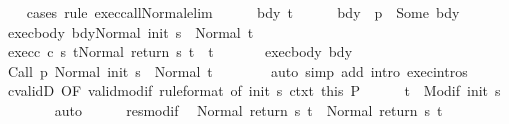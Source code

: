 \begin{isabellebody}
\ \ \isamarkupfalse%
\ {\isacharparenleft}cases\ rule{\isacharcolon}\ exec{\isacharunderscore}call{\isacharunderscore}Normal{\isacharunderscore}elim{\isacharparenright}\isanewline
\ \ \ \ \isamarkupfalse%
\ bdy\ t{\isacharprime}\isanewline
\ \ \ \ \isamarkupfalse%
\ bdy{\isacharcolon}\ {\isachardoublequoteopen}{\isasymGamma}\ p\ {\isacharequal}\ Some\ bdy{\isachardoublequoteclose}\isanewline
\ \ \ \ \isamarkupfalse%
\ exec{\isacharunderscore}body{\isacharcolon}\ {\isachardoublequoteopen}{\isasymGamma}{\isasymturnstile}{\isasymlangle}bdy{\isacharcomma}Normal\ {\isacharparenleft}init\ s{\isacharparenright}{\isasymrangle}\ {\isasymRightarrow}\ Normal\ t{\isacharprime}{\isachardoublequoteclose}\ \isanewline
\ \ \ \ \isamarkupfalse%
\ exec{\isacharunderscore}c{\isacharcolon}\ {\isachardoublequoteopen}{\isasymGamma}{\isasymturnstile}{\isasymlangle}c\ s\ t{\isacharprime}{\isacharcomma}Normal\ {\isacharparenleft}return\ s\ t{\isacharprime}{\isacharparenright}{\isasymrangle}\ {\isasymRightarrow}\ t{\isachardoublequoteclose}\ \isanewline
\ \ \ \ \isamarkupfalse%
\ exec{\isacharunderscore}body\ bdy\isanewline
\ \ \ \ \isamarkupfalse%
\ {\isachardoublequoteopen}{\isasymGamma}{\isasymturnstile}{\isasymlangle}{\isacharparenleft}Call\ p{\isacharparenright}\ {\isacharcomma}Normal\ {\isacharparenleft}init\ s{\isacharparenright}{\isasymrangle}\ {\isasymRightarrow}\ Normal\ t{\isacharprime}{\isachardoublequoteclose}\isanewline
\ \ \ \ \ \ \isamarkupfalse%
\ {\isacharparenleft}auto\ simp\ add{\isacharcolon}\ intro{\isacharcolon}\ exec{\isachardot}intros{\isacharparenright}\isanewline
\ \ \ \ \isamarkupfalse%
\ cvalidD\ {\isacharbrackleft}OF\ valid{\isacharunderscore}modif\ {\isacharbrackleft}rule{\isacharunderscore}format{\isacharcomma}\ of\ {\isachardoublequoteopen}init\ s{\isachardoublequoteclose}{\isacharbrackright}\ ctxt{\isacharprime}\ this{\isacharbrackright}\ P\isanewline
\ \ \ \ \isamarkupfalse%
\ {\isachardoublequoteopen}t{\isacharprime}\ {\isasymin}\ Modif\ {\isacharparenleft}init\ s{\isacharparenright}{\isachardoublequoteclose}\isanewline
\ \ \ \ \ \ \isamarkupfalse%
\ auto\isanewline
\ \ \ \ \isamarkupfalse%
\ res{\isacharunderscore}modif\ \isamarkupfalse%
\ {\isachardoublequoteopen}Normal\ {\isacharparenleft}return{\isacharprime}\ s\ t{\isacharprime}{\isacharparenright}\ {\isacharequal}\ Normal\ {\isacharparenleft}return\ s\ t{\isacharprime}{\isacharparenright}{\isachardoublequoteclose}\isanewline

\end{isabellebody}
